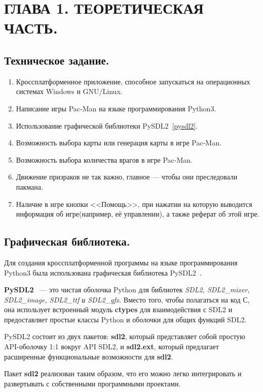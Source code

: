 \chapter{\label{ch:ch01}ГЛАВА 1. ТЕОРЕТИЧЕСКАЯ ЧАСТЬ.}

\section{\label{sec:ch01/sec01}Техническое задание.}
\begin{enumerate}
	\item Кроссплатформенное приложение, способное запускаться на операционных системах Windows и GNU/Linux.
	\item Написание игры Pac-Man на языке программирования Python3.
	\item Использование графической библиотеки PySDL2~\ref{pysdl2}.
	\item Возможность выбора карты или генерация карты в игре Pac-Man.
	\item Возможность выбора количества врагов в игре Pac-Man.
	\item Движение призраков не так важно, главное --- чтобы они преследовали пакмана.
	\item Наличие в игре кнопки <<Помощь>>, при нажатии на которую выводится информация об игре(например, её управлении), а также реферат об этой игре.
\end{enumerate}

\section{\label{sec:ch01/sec02}Графическая библиотека.}
Для создания кроссплатформенной программы на языке программирования Python3 была использована графическая библиотека PySDL2~\cite{pypiRUENpysdl2,docENpysdl2}.

\textbf{PySDL2}~\label{pysdl2} --- это чистая оболочка Python для библиотек \textit{SDL2, SDL2\_mixer, SDL2\_image, SDL2\_ttf и SDL2\_gfx}. Вместо того, чтобы полагаться на код С, она использует
встроенный модуль \textbf{ctypes} для взаимодействия с SDL2 и предоставляет простые классы Python и оболочки для общих функций SDL2.

PySDL2 состоит из двух пакетов: \textbf{sdl2}, который представляет собой простую API-оболочку 1:1 вокруг API SDL2, и \textbf{sdl2.ext}, который предлагает расширенные функциональные возможности для \textbf{sdl2}.

Пакет \textbf{sdl2} реализован таким образом, что его можно легко интегрировать и развертывать с собственными программными проектами.

